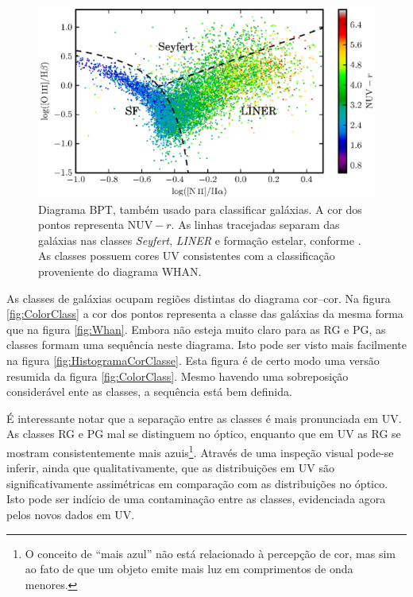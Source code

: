 \begin{figure}
	\includegraphics{figuras/bpt-uv.eps}
	\caption[Cores UV no diagrama BPT.]
	{Diagrama BPT, também usado para classificar galáxias. A cor dos
	pontos representa $\mathrm{NUV}-r$. As linhas tracejadas separam das galáxias nas
	classes {\em Seyfert}, {\em LINER} e formação estelar, conforme
	\citet[linhas S06 e K06 da tabela 1]{CidFernandes2010}. As classes possuem
	cores UV consistentes com a classificação proveniente do diagrama WHAN.}
	\label{fig:BPTUV}
\end{figure}

As classes de galáxias ocupam regiões distintas do diagrama cor--cor. Na figura
\ref{fig:ColorClass} a cor dos pontos representa a classe das galáxias da mesma
forma que na figura \ref{fig:Whan}. Embora não esteja muito claro para as RG e
PG, as classes formam uma sequência neste diagrama. Isto pode ser visto mais
facilmente na figura \ref{fig:HistogramaCorClasse}. Esta figura é de certo modo
uma versão resumida da figura \ref{fig:ColorClass}. Mesmo havendo uma
sobreposição considerável ente as classes, a sequência está bem definida.

É interessante notar que a separação entre as classes é mais pronunciada em UV.
As classes RG e PG mal se distinguem no óptico, enquanto que em UV as RG se
mostram consistentemente mais azuis\footnote{O conceito de ``mais azul'' não
está relacionado à percepção de cor, mas sim ao fato de que um objeto emite mais
luz em comprimentos de onda menores.}. Através de uma inspeção visual pode-se
inferir, ainda que qualitativamente, que as distribuições em UV são
significativamente assimétricas em comparação com as distribuições no óptico.
Isto pode ser indício de uma contaminação entre as classes, evidenciada agora
pelos novos dados em UV.

